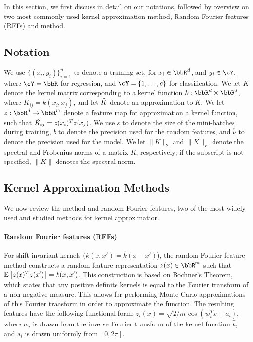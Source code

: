 In this section, we first discuss in detail on our notations, followed by overview on two most commonly used kernel approximation method, Random Fourier features (RFFs) and \Nystrom method.
\subsection{Notation}
We use $\{(x_i,y_i)\}_{i=1}^n$ to denote a training set, for $x_i \in \RR^d$, and $y_i \in \cY$, where $\cY = \RR$ for regression, and $\cY = \{1,\ldots,c\}$ for classification.  We let $K$ denote the kernel matrix corresponding to a kernel function $k:\RR^d\times\RR^d$, where $K_{ij} = k(x_i,x_j)$, and let $\tilde{K}$ denote an approximation to $K$. We let $z:\RR^d\rightarrow\RR^m$ denote a feature map for approximation a kernel function, such that $\tilde{K}_{ij} = z(x_i)^T z(x_j)$.  We use $s$ to denote the size of the mini-batches during training, $b$ to denote the precision used for the random features, and $\hat{b}$ to denote the precision used for the model.  We let $\|K\|_2$ and $\|K\|_F$ denote the spectral and Frobenius norms of a matrix $K$, respectively; if the subscript is not specified, $\|K\|$ denotes the spectral norm.

\subsection{Kernel Approximation Methods}
We now review the \Nystrom method and random Fourier features, two of the most widely used and studied methods for kernel approximation.

\paragraph{Random Fourier features (RFFs)}
For shift-invariant kernels ($k(x,x') = \hat{k}(x-x')$), the random Fourier 
feature method \citep{rahimi07random} constructs a random feature representation 
$z(x) \in \RR^m$ such that $\expect{}{z(x)^T z(x')} = k(x,x')$. This construction 
is based on Bochner's Theorem, which states that any positive definite kernels is 
equal to the Fourier transform of a non-negative measure. This allows for performing
Monte Carlo approximations of this Fourier transform in order to approximate the 
function.  The resulting features have the following functional form: 
$z_i(x) = \sqrt{2/m}\cos(w_i^Tx + a_i)$, where $w_i$ is drawn from the inverse Fourier
transform of the kernel function $\hat{k}$, and $a_i$ is drawn uniformly from $[0,2\pi]$. 


